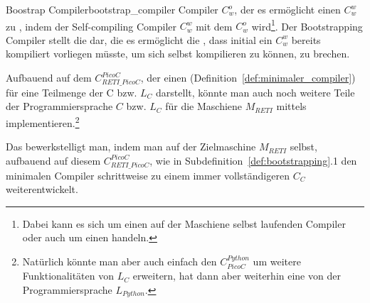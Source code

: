 \begin{Definition}{Boostrap Compiler}{bootstrap_compiler}
  Compiler $C_w^o$, der es ermöglicht einen  $C_w^w$ zu , indem der Self-compiling Compiler $C_w^w$ mit dem  $C_w^o$  wird\footnote{Dabei kann es sich um einen  auf der Maschiene selbst laufenden Compiler oder auch um einen  handeln.}. Der Bootstrapping Compiler stellt die   dar, die es ermöglicht die , dass initial ein  $C_w^w$ bereits kompiliert vorliegen müsste, um sich selbst kompilieren zu können, zu brechen.
\end{Definition}

Aufbauend auf dem  $C_{RETI\_PicoC}^{PicoC}$, der einen  (Definition~\ref{def:minimaler_compiler}) für eine Teilmenge der  C bzw. $L_C$ darstellt, könnte man auch noch weitere Teile der Programmiersprache $C$ bzw. $L_C$ für die Maschiene $M_{RETI}$ mittels  implementieren.\footnote{Natürlich könnte man aber auch einfach den  $C_{PicoC}^{Python}$ um weitere Funktionalitäten von $L_C$ erweitern, hat dann aber weiterhin eine  von der Programmiersprache $L_{Python}$.}

Das bewerkstelligt man, indem man  auf der Zielmaschine $M_{RETI}$ selbst, aufbauend auf diesem  $C_{RETI\_PicoC}^{PicoC}$, wie in Subdefinition~\ref{def:bootstrapping}{.1} den minimalen Compiler schrittweise zu einem immer vollständigeren  $C_C$ weiterentwickelt.

